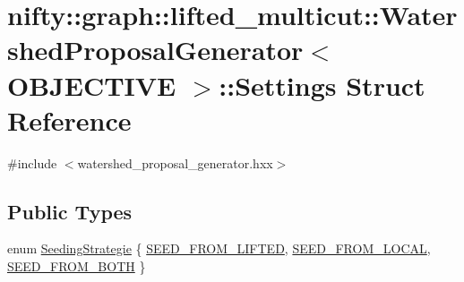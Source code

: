 \hypertarget{structnifty_1_1graph_1_1lifted__multicut_1_1WatershedProposalGenerator_1_1Settings}{}\section{nifty\+:\+:graph\+:\+:lifted\+\_\+multicut\+:\+:Watershed\+Proposal\+Generator$<$ O\+B\+J\+E\+C\+T\+I\+V\+E $>$\+:\+:Settings Struct Reference}
\label{structnifty_1_1graph_1_1lifted__multicut_1_1WatershedProposalGenerator_1_1Settings}


{\ttfamily \#include $<$watershed\+\_\+proposal\+\_\+generator.\+hxx$>$}

\subsection*{Public Types}
\begin{DoxyCompactItemize}
\item 
enum \hyperlink{structnifty_1_1graph_1_1lifted__multicut_1_1WatershedProposalGenerator_1_1Settings_ad9d03699a5519e3a5a0b565df61338f7}{Seeding\+Strategie} \{ \hyperlink{structnifty_1_1graph_1_1lifted__multicut_1_1WatershedProposalGenerator_1_1Settings_ad9d03699a5519e3a5a0b565df61338f7ae280a0df1baea11541107ce15c2c1702}{S\+E\+E\+D\+\_\+\+F\+R\+O\+M\+\_\+\+L\+I\+F\+T\+E\+D}, 
\hyperlink{structnifty_1_1graph_1_1lifted__multicut_1_1WatershedProposalGenerator_1_1Settings_ad9d03699a5519e3a5a0b565df61338f7a05ccfbf0d3e88dec83748c6ec2d34a39}{S\+E\+E\+D\+\_\+\+F\+R\+O\+M\+\_\+\+L\+O\+C\+A\+L}, 
\hyperlink{structnifty_1_1graph_1_1lifted__multicut_1_1WatershedProposalGenerator_1_1Settings_ad9d03699a5519e3a5a0b565df61338f7acd2b121ce17d8fa68b518ee2ab8b978d}{S\+E\+E\+D\+\_\+\+F\+R\+O\+M\+\_\+\+B\+O\+T\+H}
 \}
\end{DoxyCompactItemize}
